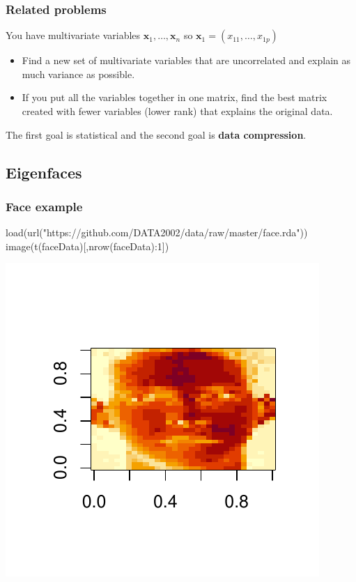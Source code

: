 \documentclass[a4paper]{article}\usepackage[]{graphicx}\usepackage[]{xcolor}
\makeatletter
\def\maxwidth{ %
  \ifdim\Gin@nat@width>\linewidth
    \linewidth
  \else
    \Gin@nat@width
  \fi
}
\makeatother
\begin{document}
\subsubsection{Related problems}
You have multivariate variables \( \symbf{x}_1,\dotsc,\symbf{x}_n \) so \( \symbf{x}_1 = (x_{11}, \dotsc, x_{1p}) \) 
\begin{itemize}
	\item Find a new set of multivariate variables that are uncorrelated and explain as much variance as possible.
	\item If you put all the variables together in one matrix, find the best matrix created with fewer variables (lower rank) that explains the original data.
\end{itemize}
The first goal is statistical and the second goal is \textcolor{myred}{\textbf{data compression}}.
\subsection{Eigenfaces}
\subsubsection{Face example}
\begin{Schunk}
\begin{Sinput}
load(url("https://github.com/DATA2002/data/raw/master/face.rda"))
image(t(faceData)[,nrow(faceData):1])
\end{Sinput}


{\centering \includegraphics[width=\maxwidth]{figure/listings-unnamed-chunk-491-1} 

}

\end{Schunk}
\end{document}

